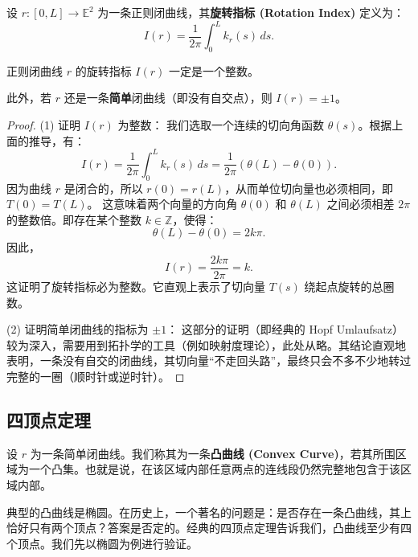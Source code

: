 \documentclass[lang=cn,10pt,thmcnt=section]{elegantbook}
\begin{document}
\begin{definition}[旋转指标]
    设 $r: [0, L] \to \mathbb{E}^2$ 为一条正则闭曲线，其\textbf{旋转指标 (Rotation Index)} 定义为：
    \[
    I(r) = \frac{1}{2\pi} \int_0^{L} k_r(s) \, ds.
    \]
\end{definition}

\begin{theorem}\label{thm:rotation_index}
    正则闭曲线 $r$ 的旋转指标 $I(r)$ 一定是一个整数。
    
    此外，若 $r$ 还是一条\textbf{简单}闭曲线（即没有自交点），则 $I(r) = \pm 1$。
\end{theorem}
\begin{proof}
    (1) 证明 $I(r)$ 为整数：
    我们选取一个连续的切向角函数 $\theta(s)$。根据上面的推导，有：
    \[
    I(r) = \frac{1}{2\pi} \int_0^{L} k_r(s) \, ds = \frac{1}{2\pi} \left( \theta(L) - \theta(0) \right).
    \]
    因为曲线 $r$ 是闭合的，所以 $r(0) = r(L)$，从而单位切向量也必须相同，即 $T(0) = T(L)$。
    这意味着两个向量的方向角 $\theta(0)$ 和 $\theta(L)$ 之间必须相差 $2\pi$ 的整数倍。即存在某个整数 $k \in \mathbb{Z}$，使得：
    \[
    \theta(L) - \theta(0) = 2k\pi.
    \]
    因此，
    \[
    I(r) = \frac{2k\pi}{2\pi} = k.
    \]
    这证明了旋转指标必为整数。它直观上表示了切向量 $T(s)$ 绕起点旋转的总圈数。

    (2) 证明简单闭曲线的指标为 $\pm 1$：
    这部分的证明（即经典的 Hopf Umlaufsatz）较为深入，需要用到拓扑学的工具（例如映射度理论），此处从略。其结论直观地表明，一条没有自交的闭曲线，其切向量“不走回头路”，最终只会不多不少地转过完整的一圈（顺时针或逆时针）。
\end{proof}
\subsection{四顶点定理}  
\begin{definition}[凸曲线]
    设 $r$ 为一条简单闭曲线。我们称其为一条\textbf{凸曲线 (Convex Curve)}，若其所围区域为一个凸集。也就是说，在该区域内部任意两点的连线段仍然完整地包含于该区域内部。
\end{definition}

典型的凸曲线是椭圆。在历史上，一个著名的问题是：是否存在一条凸曲线，其上恰好只有两个顶点？答案是否定的。经典的四顶点定理告诉我们，凸曲线至少有四个顶点。我们先以椭圆为例进行验证。
\end{document}
